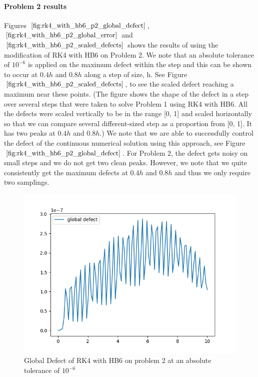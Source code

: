 \documentclass{article}
\begin{document}
\paragraph{Problem 2 results}
Figures $\ref{fig:rk4_with_hb6_p2_global_defect}$, $\ref{fig:rk4_with_hb6_p2_global_error}$ and $\ref{fig:rk4_with_hb6_p2_scaled_defects}$ shows the results of using the modification of RK4 with HB6 on Problem 2. We note that an absolute tolerance of $10^{-6}$ is applied on the maximum defect within the step and this can be shown to occur at $0.4h$ and $0.8h$ along a step of size, h. See Figure $\ref{fig:rk4_with_hb6_p2_scaled_defects}$, to see the scaled defect reaching a maximum near these points. (The figure shows the shape of the defect in a step over several steps that were taken to solve Problem 1 using RK4 with HB6. All the defects were scaled vertically to be in the range [0, 1] and scaled horizontally so that we can compare several different-sized step as a proportion from [0, 1]. It has two peaks at $0.4h$ and $0.8h$.) We note that we are able to successfully control the defect of the continuous numerical solution using this approach, see Figure $\ref{fig:rk4_with_hb6_p2_global_defect}$. For Problem 2, the defect gets noisy on small steps and we do not get two clean peaks. However, we note that we quite consistently get the maximum defects at $0.4h$ and $0.8h$ and thus we only require two samplings.

\begin{figure}[H]
\centering
\includegraphics[width=0.7\linewidth]{./figures/rk4_with_hb6_p2_global_defect}
\caption{Global Defect of RK4 with HB6 on problem 2 at an absolute tolerance of $10^{-6}$}
\label{fig:rk4_with_hb6_p2_global_defect}
\end{figure}
\end{document}
